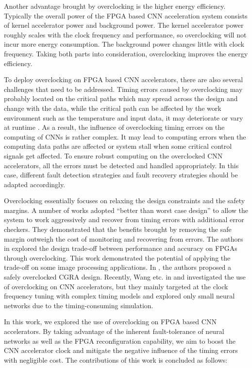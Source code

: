 Another advantage brought by overclocking is the higher 
energy efficiency. Typically the overall power of the 
FPGA based CNN acceleration system consists of kernel accelerator power 
and background power. The kernel accelerator power 
roughly scales with the clock frequency and performance, 
so overclocking will not incur more energy consumption. 
The background power changes little with clock frequency. 
Taking both parts into consideration, overclocking improves the energy efficiency.

To deploy overclocking on FPGA based CNN accelerators, there are also several
challenges that need to be addressed. Timing errors caused by overclocking 
may probably located on the critical paths which may spread across the 
design and change with the data, while the critical path can be
affected by the work environment such as the temperature 
and input data, it may deteriorate or vary at runtime \cite{Paceline_15}. 
As a result, the influence of overclocking timing 
errors on the computing of CNNs is rather complex. It may lead to
computing errors when the computing data paths are affected or system stall 
when some critical control signals get affected. To ensure robust computing 
on the overclocked CNN accelerators, all the errors must be detected and 
handled appropriately. In this case, different fault detection strategies 
and fault recovery strategies should be adapted accordingly. 

Overclocking essentially focuses on relaxing the
design constraints and the safety margins. A number of works \cite{Razor} 
\cite{uht2004going} adopted “better than worst case design” to allow the system 
to work aggressively and recover from timing 
errors \cite{austin2005opportunities} with additional error checkers. 
They demonstrated that the benefits
brought by removing the safe margin outweigh the cost
of monitoring and recovering from errors. 
The authors in \cite{overclock_3} explored the design trade-off 
between performance and accuracy on FPGAs through overclocking. 
This work demonstrated the potential of applying the trade-off on 
some image processing applications. In \cite{brant2013safe}, the authors 
proposed a safely overclocked CGRA design. Recently, Wang etc. in 
\cite{deng2015retraining} and \cite{wang2017resilience} investigated 
the use of overclocking on CNN accelerators, but they mainly targeted at 
the clock frequency tuning with complex timing models and explored 
only small neural networks due to the timing-consuming simulation.

In this work, we explored the use of overclocking on FPGA based 
CNN accelerators. By taking advantage of the inherent fault-tolerance 
of neural networks as well as the FPGA reconfiguration capability, we aim to 
boost the CNN accelerator clock and mitigate 
the negative influence of the timing errors with negligible cost. 
The contributions of this work is concluded as follows:

